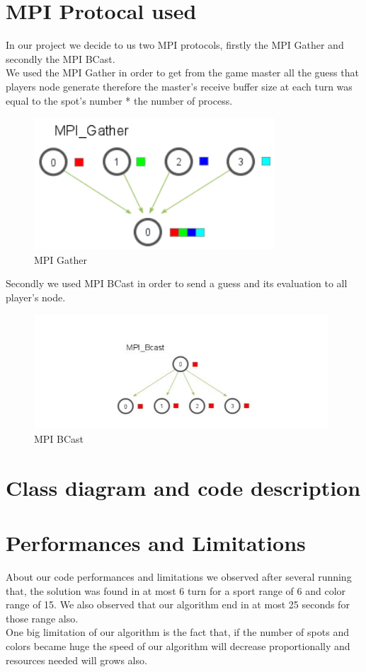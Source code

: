 \section{MPI Protocal used}
In our project we decide to us two MPI protocols, firstly the MPI Gather and secondly the MPI BCast. \\
We used the MPI Gather in order to get from the game master all the guess that players node generate therefore the master's receive buffer size at each turn  was equal to the spot's number * the number of process. 
        \begin{figure}[H]
	    \centering
	    \includegraphics[width=9cm] {gather.png}
	    \caption{MPI Gather }
	    \label{plot12}
	\end{figure}

Secondly we used MPI BCast in order to send a guess and its evaluation to all player's node.

        \begin{figure}[H]
	    \centering
	    \includegraphics[width=11cm] {bcast1.png}
	    \caption{MPI BCast  }
	    \label{plot12}
	\end{figure}

\section{Class diagram and code description}	
\section{Performances and Limitations}
About our code performances and limitations we observed after several running that, the solution was found in at most 6 turn for a sport range of 6 and color range of 15. We also observed that our algorithm end in at most 25 seconds for those range also. \\
One big limitation of our algorithm is the fact that, if the number of spots and colors became huge the speed of our algorithm will decrease proportionally and resources needed will grows also. 


